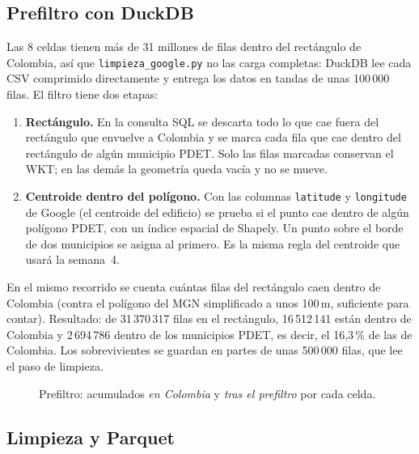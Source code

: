 \documentclass[11pt,a4paper]{article}
\newcommand{\campo}[1]{\texttt{#1}}
\begin{document}
\subsection{Prefiltro con DuckDB}
\label{sec:g-prefiltro}

Las 8 celdas tienen más de 31 millones de filas dentro del rectángulo de
Colombia, así que \campo{limpieza\_google.py} no las carga completas: DuckDB
lee cada CSV comprimido directamente y entrega los datos en tandas de unas
100\,000 filas. El filtro tiene dos etapas:
\begin{enumerate}[leftmargin=*]
  \item \textbf{Rectángulo.} En la consulta SQL se descarta todo lo que cae
        fuera del rectángulo que envuelve a Colombia y se marca cada fila que
        cae dentro del rectángulo de algún municipio PDET. Solo las filas
        marcadas conservan el WKT; en las demás la geometría queda vacía y no
        se mueve.
  \item \textbf{Centroide dentro del polígono.} Con las columnas
        \campo{latitude} y \campo{longitude} de Google (el centroide del
        edificio) se prueba si el punto cae dentro de algún polígono PDET,
        con un índice espacial de Shapely. Un punto sobre el borde de dos
        municipios se asigna al primero. Es la misma regla del centroide que
        usará la semana~4.
\end{enumerate}

En el mismo recorrido se cuenta cuántas filas del rectángulo caen dentro de
Colombia (contra el polígono del MGN simplificado a unos 100\,m, suficiente
para contar). Resultado: de 31\,370\,317 filas en el rectángulo, 16\,512\,141
están dentro de Colombia y 2\,694\,786 dentro de los municipios PDET, es decir,
el 16,3\,\% de las de Colombia. Los sobrevivientes se guardan en partes de unas
500\,000 filas, que lee el paso de limpieza.

\begin{figure}[H]
  \centering
  \caption{Prefiltro: acumulados \emph{en Colombia} y \emph{tras el prefiltro}
  por cada celda.}
  \label{fig:g-prefiltro}
\end{figure}

\subsection{Limpieza y Parquet}
\label{sec:g-limpieza}
\end{document}
